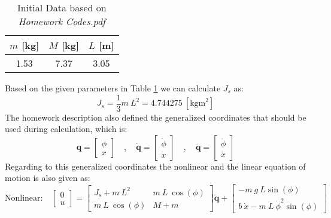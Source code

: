 \documentclass[12pt]{article}
\begin{document}
\begin{table}[htbp]
  \centering
  \caption{Initial Data based on \textit{Homework Codes.pdf}}
  \label{tab:data}
  \begin{tabular}{ccc}
    \hline
    $m$ [kg] & $M$ [kg] & $L$ [m]\\[0.2cm]
    \hline
    1.53 & 7.37 & 3.05\\
  \end{tabular}
\end{table}
\noindent Based on the given parameters in Table \ref{tab:data} we can calculate $J_s$ as:
\begin{equation}
  J_s = \dfrac{1}{3} m ~ L^2 = 4.744275 ~ \left[ \text{kgm}^2 \right]
\end{equation}
\noindent The homework description also defined the generalized coordinates that should be used during calculation, which is:
\begin{equation}
  \mathbf{q} = \begin{bmatrix}
    \phi \\
    x
  \end{bmatrix} \quad , \quad   \dot{\mathbf{q}} = \begin{bmatrix}
    \dot{\phi} \\
    \dot{x}
  \end{bmatrix} \quad , \quad   \ddot{\mathbf{q}} = \begin{bmatrix}
    \ddot{\phi} \\
    \ddot{x}
  \end{bmatrix}
\end{equation}
Regarding to this generalized coordinates the nonlinear and the linear equation of motion is also given as:
\begin{equation}
  \label{eq:nonlin}
  \text{Nonlinear:}
  \quad
  \begin{bmatrix}
      0 \\ u
  \end{bmatrix}
  =
  \begin{bmatrix}
      J_s + m ~ L^2 & m ~ L ~ \cos\left( \phi \right) \\
      m ~ L ~ \cos\left( \phi \right) & M + m
  \end{bmatrix}
  \ddot{\mathbf{q}} + \begin{bmatrix}
    -m~ g ~ L \sin\left( \phi \right) \\
    b~ \dot{x} - m ~ L \ \dot{\phi} ^2 \sin\left( \phi \right)
  \end{bmatrix}
\end{equation}
\end{document}
